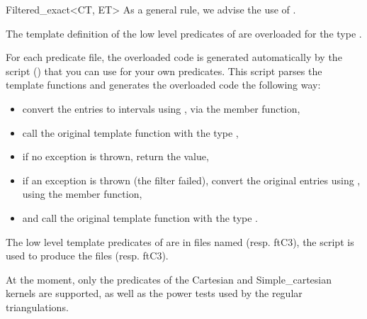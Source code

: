 \begin{ccRefClass}{Filtered_exact<CT, ET>}
As a general rule, we advise the use of
.

% 


\ccImplementation

The template definition of the low level predicates of {\cgal} are overloaded
for the type .

For each predicate file, the overloaded code is generated automatically by the
 script () that you can
use for your own predicates.
This script parses the template functions and generates the
overloaded code the following way:
\begin{itemize}
\item convert the entries to intervals using
    , via the  member function,
\item call the original template function with the type
    ,
\item if no exception is thrown, return the value,
\item if an exception is thrown (the filter failed), convert the original
    entries using , using the  member
    function,
\item and call the original template function with the type .
\end{itemize}

\ccExample

The low level template predicates of {\cgal} are in files named
 (resp. ftC3), the script is used
to produce the files 
(resp. ftC3).

At the moment, only the predicates of the Cartesian and Simple\_cartesian
kernels are supported, as well as the power tests used by the regular
triangulations.

\end{ccRefClass}
